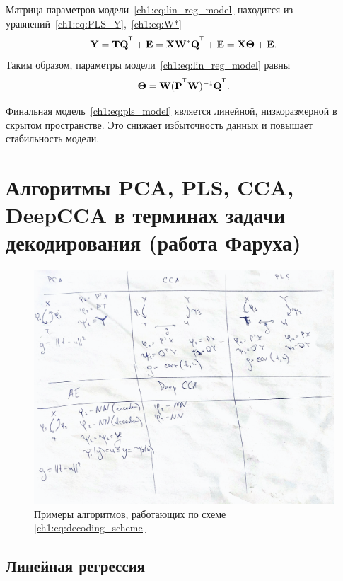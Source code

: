 Матрица параметров модели~\ref{ch1:eq:lin_reg_model} находится из уравнений~\eqref{ch1:eq:PLS_Y},~\eqref{ch1:eq:W*}
\begin{equation*}
	\bY = \bT \bQ^{\T} + \bE = \bX \bW^* \bQ^{\T} + \bE = \bX \bTheta + \bE.
	\label{ch1:eq:pls_model}
\end{equation*}
Таким образом, параметры модели~\eqref{ch1:eq:lin_reg_model} равны
\begin{equation}
	\bTheta = \bW (\bP^{\T} \bW)^{-1} \bQ^{\T}.
	\label{ch1:eq:linear_regression_model_parameters}
\end{equation}

Финальная модель~\eqref{ch1:eq:pls_model} является линейной, низкоразмерной в скрытом пространстве. 
Это снижает избыточность данных и повышает стабильность модели.

\hrulefill

\section{Алгоритмы PCA, PLS, CCA, DeepCCA в терминах задачи декодирования (работа Фаруха)}

\begin{figure}[!ht]
	\centering
	\includegraphics[width=\linewidth]{figs/ch1/Examples}
	\caption{Примеры алгоритмов, работающих по схеме \ref{ch1:eq:decoding_scheme}}
	\label{ch1:fig:PLSFigure}
\end{figure}

\subsection{Линейная регрессия}


